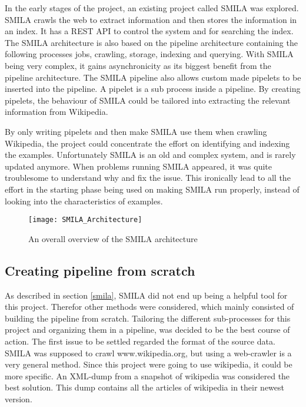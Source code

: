 In the early stages of the project, an existing project called SMILA was explored. SMILA crawls the web to extract information and then stores the information in an index. It has a REST API to control the system and for searching the index. The SMILA architecture is also based on the pipeline architecture containing the following processes jobs, crawling, storage, indexing and querying. With SMILA being very complex, it gains asynchronicity as its biggest benefit from the pipeline architecture. The SMILA pipeline also allows custom made pipelets to be inserted into the pipeline. A pipelet is a sub process inside a pipeline. By creating pipelets, the behaviour of SMILA could be tailored into extracting the relevant information from Wikipedia.

By only writing pipelets and then make SMILA use them when crawling Wikipedia, the project could concentrate the effort on identifying and indexing the examples. Unfortunately SMILA is an old and complex system, and is rarely updated anymore. When problems running SMILA appeared, it was quite troublesome to understand why and fix the issue. This ironically lead to all the effort in the starting phase being used on making SMILA run properly, instead of looking into the characteristics of examples. 

\begin{figure}[h]
\caption{An overall overview of the SMILA architecture}
\texttt{[image: SMILA\_Architecture]}
\end{figure}

\subsection{Creating pipeline from scratch} \label{custom-pipeline}



As described in section \ref{smila}, SMILA did not end up being a helpful tool for this project. Therefor other methods were considered, which mainly consisted of building the pipeline from scratch. Tailoring the different sub-processes for this project and organizing them in a pipeline, was decided to be the best course of action. The first issue to be settled regarded the format of the source data. SMILA was supposed to crawl www.wikipedia.org, but using a web-crawler is a very general method. Since this project were going to use wikipedia, it could be more specific. An XML-dump from a snapshot of wikipedia was considered the best solution. This dump contains all the articles of wikipedia in their newest version.

